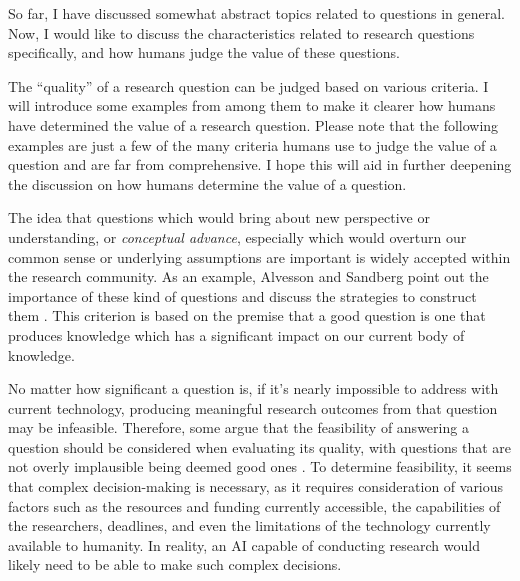 So far, I have discussed somewhat abstract topics related to questions in general. Now, I would like to discuss the characteristics related to research questions specifically, and how humans judge the value of these questions. 

The ``quality'' of a research question can be judged based on various criteria. I will introduce some examples from among them to make it clearer how humans have determined the value of a research question. Please note that the following examples are just a few of the many criteria humans use to judge the value of a question and are far from comprehensive. I hope this will aid in further deepening the discussion on how humans determine the value of a question.

The idea that questions which would bring about new perspective or understanding, or \textit{conceptual advance}, especially which would overturn our common sense or underlying assumptions are important is widely accepted within the research community. As an example, Alvesson and Sandberg point out the importance of these kind of questions and discuss the strategies to construct them \cite{alvesson2013constructing}. 
This criterion is based on the premise that a good question is one that produces knowledge which has a significant impact on our current body of knowledge.

No matter how significant a question is, if it's nearly impossible to address with current technology, producing meaningful research outcomes from that question may be infeasible. Therefore, some argue that the feasibility of answering a question should be considered when evaluating its quality, with questions that are not overly implausible being deemed good ones \cite{hulley2007designing,alon2009choose,huntington2021effect}. To determine feasibility, it seems that complex decision-making is necessary, as it requires consideration of various factors such as the resources and funding currently accessible, the capabilities of the researchers, deadlines, and even the limitations of the technology currently available to humanity. In reality, an AI capable of conducting research would likely need to be able to make such complex decisions.

